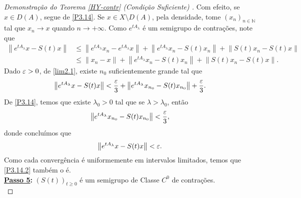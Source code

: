 \begin{proof}[Demonstração do Teorema {\ref{HY-contr}} (Condição Suficiente) ]
Com efeito, se $x\in D(A)$, segue de \eqref{P3.14}. Se $x\in X\setminus D(A)$, 
pela densidade, tome $(x_n)_{n\in \mathbb{N}}$ tal que $x_n\to x$ quando $n\to +\infty$.
Como $e^{tA_\lambda}$ é um semigrupo de contrações, note que
\begin{align*}
\left\|e^{tA_{\lambda}}x-S(t)x\right\|
& \leq \left\|e^{tA_{\lambda}}x_n-e^{tA_\lambda}x\right\|
+\left\|e^{tA_{\lambda}}x_n-S(t)x_n\right\|
+\left\|S(t)x_n-S(t)x\right\|\\
&\leq  \|x_n-x\|
+\left\|e^{tA_{\lambda}}x_n-S(t)x_n\right\|
+\left\|S(t)x_n-S(t)x\right\|.
\end{align*}
Dado $\varepsilon>0$, de \eqref{lim2.1}, existe $n_0$ suficientemente grande tal  que
\begin{equation*}
\left\|e^{tA_{\lambda}}x-S(t)x\right\|
<  \frac{\varepsilon}{3}
+\left\|e^{tA_{\lambda}}x_{n_0}-S(t)x_{n_0}\right\|
+\frac{\varepsilon}{3}.
\end{equation*}
De \eqref{P3.14}, temos que existe $\lambda_0>0$ tal que se $\lambda>\lambda_0$, então
\begin{equation*}
\left\|e^{tA_{\lambda}}x_{n_0}-S(t)x_{n_0}\right\| < \frac{\varepsilon}{3},
\end{equation*}
donde concluímos que
\begin{equation*}
\left\|e^{tA_{\lambda}}x-S(t)x\right\|
<\varepsilon.
\end{equation*}
Como cada convergência é uniformemente em intervalos limitados, temos que \eqref{P3.14.2} também o é.
\\

\noindent\textbf{\underline{Passo 5}:} $(S(t))_{t\geq 0}$ é um semigrupo de Classe $C^0$ de contrações.
\\


\end{proof}
